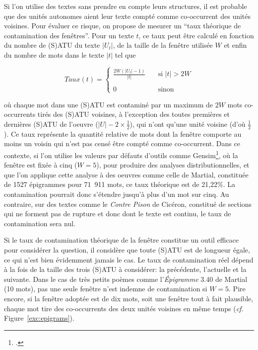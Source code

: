 Si l'on utilise des textes sans prendre en compte leurs structures, il est probable que des unités autonomes aient leur texte compté comme co-occurrent des unités voisines. Pour évaluer ce risque, on propose de mesurer un \enquote{taux théorique de contamination des fenêtres}. Pour un texte $t$, ce taux peut être calculé en fonction du nombre de (S)ATU du texte $\left | U_{t} \right |$, de la taille de la fenêtre utilisée $W$ et enfin du nombre de mots dans le texte $\left | t \right |$ tel que

\begin{equation*}
    Taux(t) = \left \{ %
    \begin{array}{ll}
         \frac{2W(\left|U_{t}\right| - 1)}{\left|t\right|} & \quad \text{si $\left|t\right| > 2W$} \\\\
         0 & \quad \text{sinon}
    \end{array} %
    \right .
\label{equation:twcr}
\end{equation*}

\noindent où chaque mot dans une (S)ATU est contaminé par un maximum de $2W$ mots co-occurrents tirés des (S)ATU voisines, à l'exception des toutes premières et dernières (S)ATU de l'oeuvre ($\left|U\right| - 2 \times \frac{1}{2}$), qui n'ont qu'une unité voisine (d'où $\frac{1}{2}$). Ce taux représente la quantité relative de mots dont la fenêtre comporte au moins un voisin qui n'est pas censé être compté comme co-occurrent. Dans ce contexte, si l'on utilise les valeurs par défauts d'outils comme Gensim\footcite{vrehuuvrek2011gensim}, où la fenêtre est fixée à cinq ($W=5$), pour produire des analyses distributionnelles, et que l'on applique cette analyse à des oeuvres comme celle de Martial, constituée de 1527 épigrammes pour 71~911 mots, ce taux théorique est de 21,22\%. La contamination pourrait donc s'étendre jusqu'à plus d'un mot sur cinq. Au contraire, sur des textes comme le \textit{Contre Pison} de Cicéron, constitué de sections qui ne forment pas de rupture et donc dont le texte est continu, le taux de contamination sera nul.

Si le taux de contamination théorique de la fenêtre constitue un outil efficace pour considérer la question, il considère que toute (S)ATU est de longueur égale, ce qui n'est bien évidemment jamais le cas. Le taux de contamination réel dépend à la fois de la taille des trois (S)ATU à considérer: la précédente, l'actuelle et la suivante. Dans le cas de très petits poèmes comme l'\textit{Épigramme} 3.40 de Martial (10 mots), pas une seule fenêtre n’est indemne de contamination si $W=5$. Pire encore, si la fenêtre adoptée est de dix mots, soit une fenêtre tout à fait plausible, chaque mot tire des co-occurrents des deux unités voisines en même temps (\textit{cf.} Figure~\ref{exc:epigrams}).

